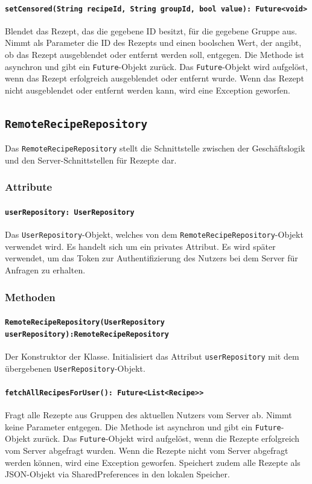 \documentclass{entwurfsheft}
\begin{document}
\begin{sloppypar}
\paragraph{\texttt{setCensored(String recipeId, String groupId, bool value): Future<void>}}
Blendet das Rezept, das die gegebene ID besitzt, für die gegebene Gruppe aus. Nimmt als Parameter die ID des Rezepts und einen boolschen Wert, der angibt, ob das Rezept ausgeblendet oder entfernt werden soll, entgegen. Die Methode ist asynchron und gibt ein \texttt{Future}-Objekt zurück. Das \texttt{Future}-Objekt wird aufgelöst, wenn das Rezept erfolgreich ausgeblendet oder entfernt wurde. Wenn das Rezept nicht ausgeblendet oder entfernt werden kann, wird eine Exception geworfen.
\newpage
\subsection{\texttt{RemoteRecipeRepository}}\label{sec:remoteRecipeRepository}
Das \texttt{RemoteRecipeRepository} stellt die Schnittstelle zwischen der Geschäftslogik und den Server-Schnittstellen für Rezepte dar.
\subsubsection*{Attribute}
\paragraph{\texttt{userRepository: UserRepository}}
Das \texttt{UserRepository}-Objekt, welches von dem \texttt{Remote\-Recipe\-Repository}-Objekt verwendet wird. Es handelt sich um ein privates Attribut. Es wird später verwendet, um das Token zur Authentifizierung des Nutzers bei dem Server für Anfragen zu erhalten.
\subsubsection*{Methoden}
\paragraph{\texttt{RemoteRecipeRepository(UserRepository userRepository):RemoteRecipeRepository\\}}
Der Konstruktor der Klasse. Initialisiert das Attribut \texttt{userRepository} mit dem übergebenen \texttt{UserRepository}-Objekt.
\paragraph{\texttt{fetchAllRecipesForUser(): Future<List<Recipe>>}}
Fragt alle Rezepte aus Gruppen des aktuellen Nutzers vom Server ab. Nimmt keine Parameter entgegen. Die Methode ist asynchron und gibt ein \texttt{Future}-Objekt zurück. Das \texttt{Future}-Objekt wird aufgelöst, wenn die Rezepte erfolgreich vom Server abgefragt wurden. Wenn die Rezepte nicht vom Server abgefragt werden können, wird eine Exception geworfen. Speichert zudem alle Rezepte als JSON-Objekt via \Gls{SharedPreferences} in den lokalen Speicher.

\end{sloppypar}
\end{document}
